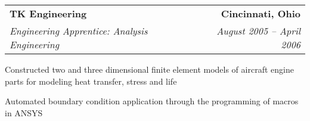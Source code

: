 \begin{tabular*}{6.6in}{@{\extracolsep{\fill}}lr}
\textbf{TK Engineering} & \textbf{Cincinnati, Ohio}\\
\textit{Engineering Apprentice: Analysis Engineering} & \textit{August 2005 -- April 2006}
\end{tabular*}
\begin{compactitem} 
\item Constructed two and three dimensional finite element models of aircraft engine parts for modeling heat transfer, stress and life
\item Automated boundary condition application through the programming of macros in ANSYS\medskip
\end{compactitem} 
